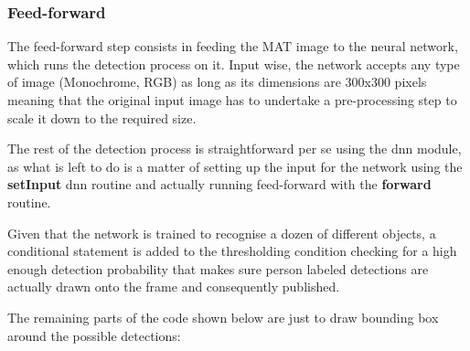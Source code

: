 \subsubsection{Feed-forward}

The feed-forward step consists in feeding the MAT image to the neural network, which runs the detection process on it. Input wise, the network accepts any type of image (Monochrome, RGB) as long as its dimensions are 300x300 pixels meaning that the original input image has to undertake a pre-processing step to scale it down to the required size.

The rest of the detection process is straightforward per se using the dnn module, as what is left to do is a matter of setting up the input for the network using the \textbf{setInput} dnn routine and actually running feed-forward with the \textbf{forward} routine.

Given that the network is trained to recognise a dozen of different objects, a conditional statement is added to the thresholding condition checking for a high enough detection probability that makes sure person labeled detections are actually drawn onto the frame and consequently published.

The remaining parts of the code shown below are just to draw bounding box around the possible detections:

